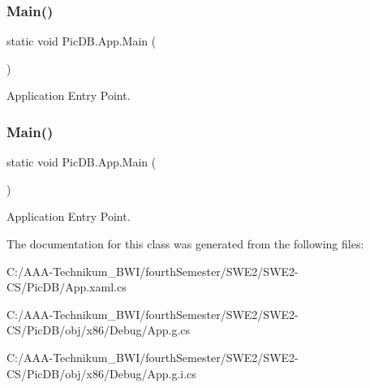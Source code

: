 \subsubsection{\texorpdfstring{Main()}{Main()}\hspace{0.1cm}{\footnotesize\ttfamily [1/2]}}
{\footnotesize\ttfamily static void Pic\+D\+B.\+App.\+Main (\begin{DoxyParamCaption}{ }\end{DoxyParamCaption})\hspace{0.3cm}{\ttfamily [static]}}



Application Entry Point. 

\mbox{\label{class_pic_d_b_1_1_app_ab2af6a7ddcf2878c6e054101dffa3aee}} 
\subsubsection{\texorpdfstring{Main()}{Main()}\hspace{0.1cm}{\footnotesize\ttfamily [2/2]}}
{\footnotesize\ttfamily static void Pic\+D\+B.\+App.\+Main (\begin{DoxyParamCaption}{ }\end{DoxyParamCaption})\hspace{0.3cm}{\ttfamily [static]}}



Application Entry Point. 



The documentation for this class was generated from the following files\+:\begin{DoxyCompactItemize}
\item 
C\+:/\+A\+A\+A-\/\+Technikum\+\_\+\+B\+W\+I/fourth\+Semester/\+S\+W\+E2/\+S\+W\+E2-\/\+C\+S/\+Pic\+D\+B/App.\+xaml.\+cs\item 
C\+:/\+A\+A\+A-\/\+Technikum\+\_\+\+B\+W\+I/fourth\+Semester/\+S\+W\+E2/\+S\+W\+E2-\/\+C\+S/\+Pic\+D\+B/obj/x86/\+Debug/App.\+g.\+cs\item 
C\+:/\+A\+A\+A-\/\+Technikum\+\_\+\+B\+W\+I/fourth\+Semester/\+S\+W\+E2/\+S\+W\+E2-\/\+C\+S/\+Pic\+D\+B/obj/x86/\+Debug/App.\+g.\+i.\+cs\end{DoxyCompactItemize}
